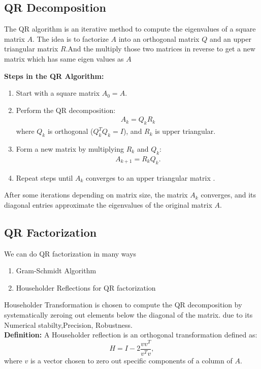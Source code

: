 \documentclass[12pt]{article}
\begin{document}
\subsection{QR Decomposition}
The QR algorithm is an iterative method to compute the eigenvalues of a square matrix  $A$. The idea is to  factorize $ A $ into an orthogonal matrix $Q$ and an upper triangular matrix $ R $.And the multiply those two matrices in reverse to get a new matrix which has same eigen values as $A$

\textbf{Steps in the QR Algorithm:}
\begin{enumerate}
    \item Start with a square matrix $ A_0 = A $.
    \item Perform the QR decomposition:
    \begin{align*}
    A_k = Q_k R_k
    \end{align*}
    where $ Q_k $ is orthogonal ($ Q_k^T Q_k = I $), and $ R_k $ is upper triangular.
    \item Form a new matrix by multiplying $ R_k $ and $ Q_k $:
    \begin{align*}
       A_{k+1} = R_k Q_k.
    \end{align*}
    
    \item Repeat steps until $ A_k $ converges to an upper triangular matrix .
\end{enumerate}

After some iterations depending on matrix size, the matrix $ A_k $ converges, and its diagonal entries approximate the eigenvalues of the original matrix $ A $.



\subsection{ QR Factorization}
We can do QR factorization in many ways 
\begin{enumerate}
    \item Gram-Schmidt Algorithm
    \item Householder Reflections for QR factorization
\end{enumerate}
Householder Transformation is chosen to compute the QR decomposition by systematically zeroing out elements below the diagonal of the matrix. 
due to its Numerical stabilty,Precision, Robustness.
\\
\textbf{Definition:}  
A Householder reflection is an orthogonal transformation defined as:
\[
H = I - 2 \frac{vv^T}{v^T v},
\]
where $ v $ is a vector chosen to zero out specific components of a column of $ A $.
\end{document}
